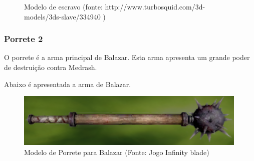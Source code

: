 \begin{itemize}
\begin{figure}[ht]
 \caption{Modelo de escravo (fonte: http://www.turbosquid.com/3d-models/3ds-slave/334940 )}
\label{img:escrava}
\end{figure}
\end{itemize}
\subsubsection{Porrete 2}
O porrete é a arma principal de Balazar. Esta arma apresenta um grande poder de destruição contra Medrash.

Abaixo é apresentada a arma de Balazar.

\begin{figure}[ht]
 \centering
 \includegraphics[scale=1]{Imagens/porrete02.png}
 \caption{Modelo de Porrete para Balazar (Fonte: Jogo Infinity blade)}
\label{img:porrete02}
\end{figure}